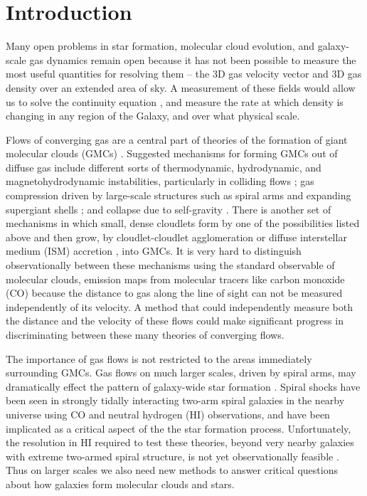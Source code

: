 \section{Introduction}
Many open problems in star formation, molecular cloud evolution, and galaxy-scale gas dynamics remain open because it has not been possible to measure the most useful quantities for resolving them -- the 3D gas velocity vector and 3D gas density over an extended area of sky. A measurement of these fields would allow us to solve the continuity equation \cite{euler1757principes}, and measure the rate at which density is changing in any region of the Galaxy, and over what physical scale. 

Flows of converging gas are a central part of theories of the formation of giant molecular clouds (GMCs) \cite{Vazquez_Semadeni_2007,Audit_2005}. Suggested mechanisms for forming GMCs out of diffuse gas include different sorts of thermodynamic, hydrodynamic, and magnetohydrodynamic instabilities, particularly in colliding flows \citep{Clark:2012bq,2014ApJ...790...37C,Heitsch06}; gas compression driven by large-scale structures such as spiral arms and expanding supergiant shells \citep{Roberts:1972bp,Bonnell:2006hn,Fujimoto:2014kh}; and collapse due to self-gravity \citep{Kim:2002da,2012MNRAS.425.2157D,VazquezSemadeni:2007cj}.
There is another set of mechanisms in which small, dense cloudlets form by one of the possibilities listed above and then grow, by cloudlet-cloudlet agglomeration \citep{Roberts:1987eb,Dobbs:2008ez,Tasker:2009gc} or diffuse interstellar medium (ISM) accretion \citep{Goldbaum:2011kj,Heitsch:2013jp}, into GMCs. It is very hard to distinguish observationally between these mechanisms using the standard observable of molecular clouds, emission maps from molecular tracers like carbon monoxide (CO) because the distance to gas along the line of sight can not be measured independently of its velocity. A method that could independently measure both the distance and the velocity of these flows could make significant progress in discriminating between these many theories of converging flows.

The importance of gas flows is not restricted to the areas immediately surrounding GMCs. Gas flows on much larger scales, driven by spiral arms, may dramatically effect the pattern of galaxy-wide star formation \cite{Roberts_1972,Bonnell_2006}. Spiral shocks have been seen in strongly tidally interacting two-arm spiral galaxies in the nearby universe \cite{Visser:1980vc,Visser:1980ud,Shetty_2007} using CO and neutral hydrogen (HI) observations, and have been implicated as a critical aspect of the the star formation process. Unfortunately, the resolution in HI required to test these theories, beyond very nearby galaxies with extreme two-armed spiral structure, is not yet observationally feasible \cite{Visser:1980ud}. Thus on larger scales we also need new methods to answer critical questions about how galaxies form molecular clouds and stars. 

